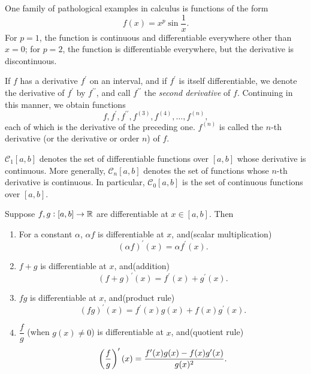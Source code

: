 \begin{example}
One family of pathological examples in calculus is functions of the form
\[f(x)=x^p\sin\frac{1}{x}.\]
For $p=1$, the function is continuous and differentiable everywhere other than $x=0$; for $p=2$, the function is differentiable everywhere, but the derivative is discontinuous.
\end{example}

\begin{notation}
If $f$ has a derivative $f^\prime$ on an interval, and if $f^\prime$ is itself differentiable, we denote the derivative of $f^\prime$ by $f^{\prime\prime}$, and call $f^{\prime\prime}$ the \emph{second derivative} of $f$. Continuing in this manner, we obtain functions
\[f,f^\prime,f^{\prime\prime},f^{(3)},f^{(4)},\dots,f^{(n)},\]
each of which is the derivative of the preceding one. $f^{(n)}$ is called the $n$-th derivative (or the derivative or order $n$) of $f$.
\end{notation}

\begin{notation}
$\mathcal{C}_1[a,b]$ denotes the set of differentiable functions over $[a,b]$ whose derivative is continuous. More generally, $\mathcal{C}_n[a,b]$ denotes the set of functions whose $n$-th derivative is continuous. In particular, $\mathcal{C}_0[a,b]$ is the set of continuous functions over $[a,b]$.
\end{notation}

\begin{lemma}
Suppose $f,g:[a,b]\to\mathbb R$ are differentiable at $x\in[a,b]$. Then
\begin{enumerate}[label=(\roman*)]
\item For a constant $\alpha$, $\alpha f$ is differentiable at $x$, and\hfill(scalar multiplication)
\[(\alpha f)^\prime(x)=\alpha f^\prime(x).\]
\item $f+g$ is differentiable at $x$, and\hfill(addition)
\[(f+g)^\prime(x)=f^\prime(x)+g^\prime(x).\]
\item $fg$ is differentiable at $x$, and\hfill(product rule)
\[(fg)^\prime(x)=f^\prime(x)g(x)+f(x)g^\prime(x).\]
\item $\dfrac{f}{g}$ (when $g(x)\neq0$) is differentiable at $x$, and\hfill(quotient rule)
\[\left(\frac{f}{g}\right)^\prime(x)=\frac{f^\prime(x)g(x)-f(x)g^\prime(x)}{g(x)^2}.\]
\end{enumerate}
\end{lemma}

